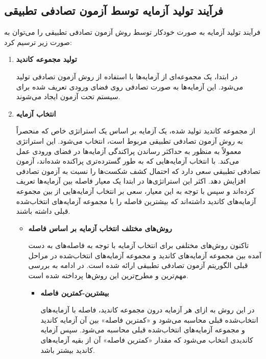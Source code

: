 \subsection{فرآیند تولید آزمایه توسط آزمون تصادفی تطبیقی}

فرآیند تولید آزمایه به صورت خودکار توسط روش آزمون تصادفی تطبیقی را می‌توان به صورت زیر ترسیم کرد:
\begin{enumerate}
	\item \textbf{تولید مجموعه کاندید}
	
	 در ابتدا، یک مجموعه‌ای از آزمایه‌ها با استفاده از روش آزمون تصادفی تولید می‌شود. این آزمایه‌ها به صورت تصادفی روی فضای ورودی تعریف شده برای سیستم تحت آزمون ایجاد می‌شوند.
	 
	\item \textbf{انتخاب آزمایه}
	
	 از مجموعه کاندید تولید شده، یک آزمایه بر اساس یک استراتژی خاص که منحصراً به روش آزمون تصادفی تطبیقی مربوط است، انتخاب می‌شود. این استراتژی معمولاً به منظور به حداکثر رساندن پراکندگی آزمایه‌ها در فضای ورودی عمل می‌کند. با انتخاب آزمایه‌هایی که به طور گسترده‌تری پراکنده شده‌اند، آزمون تصادفی تطبیقی سعی دارد که احتمال کشف شکست‌ها را نسبت به آزمون تصادفی افزایش دهد. اکثر این استراتژی‌ها در ابتدا یک معیار فاصله بین آزمایه‌ها تعریف کرده‌اند و سپس با توجه به این معیار، سعی بر انتخاب آزمایه‌هایی از بین مجموعه آزمایه‌های کاندید داشته‌اند که بیشترین فاصله را با مجموعه آزمایه‌های انتخاب‌شده قبلی داشته باشند.
	 
	\begin{itemize}
		\item \textbf{روش‌های مختلف انتخاب آزمایه بر اساس فاصله}
		
		تاکنون روش‌های مختلفی برای انتخاب آزمایه با توجه به فاصله‌های به دست آمده بین مجموعه آزمایه‌های کاندید و مجموعه آزمایه‌های انتخاب‌شده در مراحل قبلی الگوریتم آزمون تصادفی تطبیقی ارائه شده است. در ادامه به بررسی مهم‌ترین و مطرح‌ترین این روش‌ها پرداخته شده است.
		
		\begin{itemize}
			\item \textbf{بیشترین-کمترین فاصله}
			 
			در این روش \cite{chen2001proportional} به ازای هر آزمایه درون مجموعه کاندید، فاصله با آزمایه‌های انتخاب‌شده قبلی محاسبه می‌شود و «کمترین فاصله» بین آن آزمایه کاندید و مجموعه آزمایه‌های انتخاب‌شده قبلی محاسبه می‌شود. سپس آزمایه‌ کاندیدی انتخاب می‌شود که مقدار «کمترین فاصله» آن از بقیه آزمایه‌های کاندید بیشتر باشد.
			

\end{itemize}
\end{itemize}
\end{enumerate}
